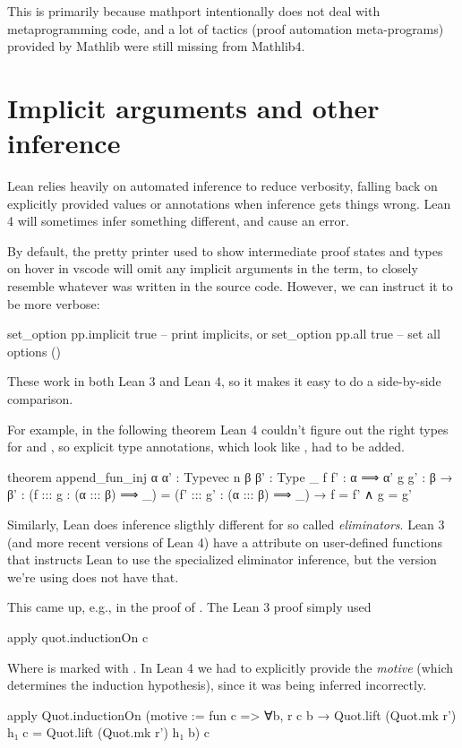 This is primarily because mathport intentionally does not deal with metaprogramming code, and a lot
of tactics (proof automation meta-programs) provided by Mathlib were still missing from Mathlib4.


\section{Implicit arguments and other inference}
Lean relies heavily on automated inference to reduce verbosity, falling back on explicitly provided
values or annotations when inference gets things wrong.
Lean 4 will sometimes infer something different, and cause an error.

By default, the pretty printer used to show intermediate proof states and types on hover in vscode will
omit any implicit arguments in the term, to closely resemble whatever was written in the source code.
However, we can instruct it to be more verbose:
\begin{leancode}
  set_option pp.implicit true -- print implicits, or
  set_option pp.all true      -- set all options ()
\end{leancode}
These work in both Lean 3 and Lean 4, so it makes it easy to do a side-by-side comparison.

For example, in the following theorem Lean 4 couldn't figure out the right types for  and 
, so explicit type annotations, which look like , had to be added.
\begin{leancode}
  theorem append_fun_inj {α α' : Typevec n} {β β' : Type _} 
                         {f f' : α ⟹ α'} {g g' : β → β'} :
  (f ::: g : (α ::: β) ⟹ _) = (f' ::: g' : (α ::: β) ⟹ _) → f = f' ∧ g = g'
\end{leancode}

Similarly, Lean does inference sligthly different for so called \emph{eliminators}.
Lean 3 (and more recent versions of Lean 4) have a  attribute on user-defined
functions that instructs Lean to use the specialized eliminator inference, but the version we're using
does not have that.

This came up, e.g., in the proof of . The Lean 3 proof simply used
\begin{leancode}    
  apply quot.inductionOn c
\end{leancode}  
Where  is marked with .
In Lean 4 we had to explicitly provide the \emph{motive} (which determines the induction hypothesis), 
since it was being inferred incorrectly.
\begin{leancode}
  apply Quot.inductionOn (motive := fun c => ∀b, r c b → 
                                      Quot.lift (Quot.mk r') h₁ c 
                                      = Quot.lift (Quot.mk r') h₁ b) 
            c
\end{leancode}

